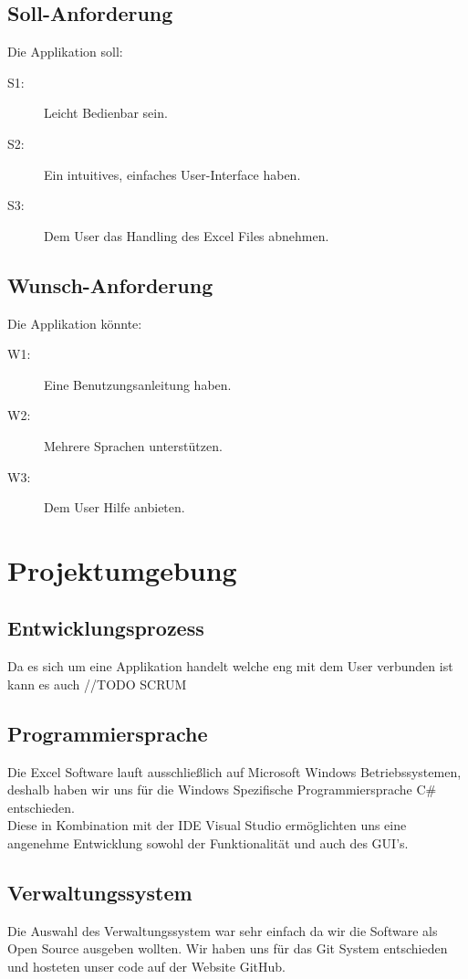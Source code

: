 \documentclass{article}
\begin{document}
\subsection{Soll-Anforderung}
Die Applikation soll:
\begin{description}
	\item[S1:] Leicht Bedienbar sein.
	\item[S2:] Ein intuitives, einfaches User-Interface haben.
	\item[S3:] Dem User das Handling des Excel Files abnehmen.
\end{description}

\subsection{Wunsch-Anforderung}
Die Applikation könnte:
\begin{description}
	\item[W1:] Eine Benutzungsanleitung haben.
	\item[W2:] Mehrere Sprachen unterstützen.
	\item[W3:] Dem User Hilfe anbieten.
\end{description}

\newpage

\section{Projektumgebung}
\vspace{5mm}
\subsection{Entwicklungsprozess	}
Da es sich um eine Applikation handelt welche eng mit dem User verbunden ist kann es auch //TODO SCRUM

\subsection{Programmiersprache}
Die Excel Software lauft ausschließlich auf Microsoft Windows Betriebssystemen, deshalb haben wir uns für die Windows Spezifische Programmiersprache C\# entschieden. \\ Diese in Kombination mit der IDE Visual Studio ermöglichten uns eine angenehme Entwicklung sowohl der Funktionalität und auch des GUI's.
 

\subsection{Verwaltungssystem}
Die Auswahl des Verwaltungssystem war sehr einfach da wir die Software als Open Source ausgeben wollten. Wir haben uns für das Git System entschieden und hosteten unser code auf der Website GitHub.
\end{document}
